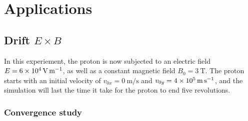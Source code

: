 \documentclass[a4paper,12pt,twoside]{article}
\begin{document}



\section{Applications}
\subsection{Drift $E\times B$}
In this experiement, the proton is now subjected to an electric field $E=\SI{6d4}{\volt\per\meter}$, as well as a constant magnetic field $B_0 = \SI{3}{\tesla}$.
The proton starts with an initial velocity of $v_{0x}=\SI{0}{\meter\per\second}$ and $v_{0y}=\SI{4d5}{\meter\per\second}$, and the simulation will last the time it take for the proton to end five revolutions.
\subsubsection{Convergence study}%
\end{document}
